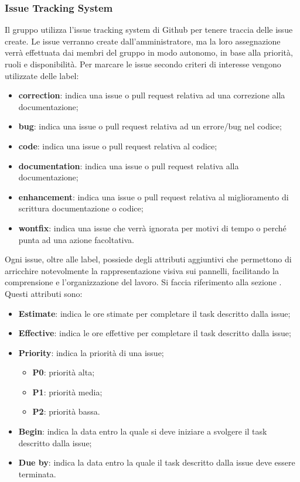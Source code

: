         \subsubsection{Issue Tracking System}\label{inf:its}
        Il gruppo utilizza l'issue tracking system di Github per tenere traccia delle issue create. Le issue verranno
        create dall'amministratore, ma la loro assegnazione verrà effettuata dai membri del gruppo in modo autonomo, in base
        alla priorità, ruoli e disponibilità.
        Per marcare le issue secondo criteri di interesse vengono utilizzate delle label:
        \begin{itemize}
            \item \textbf{correction}: indica una issue o pull request relativa ad una correzione alla documentazione;
            \item \textbf{bug}: indica una issue o pull request relativa ad un errore/bug nel codice;
            \item \textbf{code}: indica una issue o pull request relativa al codice;
            \item \textbf{documentation}: indica una issue o pull request relativa alla documentazione;
            \item \textbf{enhancement}: indica una issue o pull request relativa al miglioramento di scrittura documentazione o codice;
            \item \textbf{wontfix}: indica una issue che verrà ignorata per motivi di tempo o perché punta ad una azione facoltativa.
        \end{itemize}
        Ogni issue, oltre alle label, possiede degli attributi aggiuntivi che permettono di arricchire
        notevolmente la rappresentazione visiva sui pannelli, facilitando la comprensione e l'organizzazione del lavoro.
        Si faccia riferimento alla sezione .
        Questi attributi sono:
        \begin{itemize}
            \item \textbf{Estimate}: indica le ore stimate per completare il task descritto dalla issue;
            \item \textbf{Effective}: indica le ore effettive per completare il task descritto dalla issue;
            \item \textbf{Priority}: indica la priorità di una issue;
            \begin{itemize}
                \item \textbf{P0}: priorità alta;
                \item \textbf{P1}: priorità media;
                \item \textbf{P2}: priorità bassa.
            \end{itemize}
            \item \textbf{Begin}: indica la data entro la quale si deve iniziare a svolgere il task descritto dalla issue;
            \item \textbf{Due by}: indica la data entro la quale il task descritto dalla issue deve essere terminata.
        \end{itemize}

